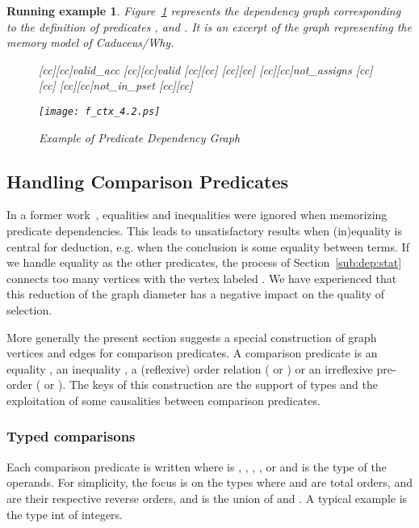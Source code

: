 \documentclass{acm_proc_article-sp}
\theoremstyle{nonumberplain}
\newtheorem{xpl}{Running example}}
\begin{document}
\begin{xpl}
Figure~\ref{fig:dep_graph_axiom} represents the dependency graph
corresponding to the definition of predicates ,  and .
It is an excerpt of the graph representing the memory model of
Caduceus/Why.



\begin{figure}
\label{fig:not_assign_dep}
\begin{center}
[cc][cc]{\textsf{valid\_acc}}
[cc][cc]{\textsf{valid}}
[cc][cc]{}
[cc][cc]{}
[cc][cc]{\textsf{not\_assigns}}
[cc][cc]{}
[cc][cc]{\textsf{not\_in\_pset}}
[cc][cc]{}

\texttt{[image: f\_ctx\_4.2.ps]}
\end{center}
\caption{Example of Predicate Dependency Graph
\label{fig:dep_graph_axiom}}
\end{figure}
\end{xpl}

\subsection{Handling Comparison Predicates}\label{sub:dep:eq}
In a former work~\cite{couchot07FTP}, equalities and inequalities were
ignored when memorizing predicate dependencies. This leads to
unsatisfactory results when (in)equality is central for deduction, e.g.
when the conclusion is some equality between terms. If we handle
equality as the other predicates, the process of
Section~\ref{sub:dep:stat} connects too many vertices with the vertex
labeled . We have experienced that this reduction of the graph
diameter has a negative impact on the quality of selection.



More generally the present section suggests a special construction of
graph vertices and edges for comparison predicates. A comparison
predicate is an equality , an inequality , a (reflexive) order
relation ( or ) or an irreflexive pre-order ( or ).
The keys of this construction are the support of types and the
exploitation of some causalities between comparison predicates.



\subsubsection{Typed comparisons}
Each comparison predicate  is written  where  is
, , , ,  or  and  is the type of the
 operands. For simplicity, the focus is on
 the types  where  and  are total orders,  and
  are their respective reverse orders, and  is the union of
  and . A typical example is the type \textsf{int} of
 integers.
\end{document}
